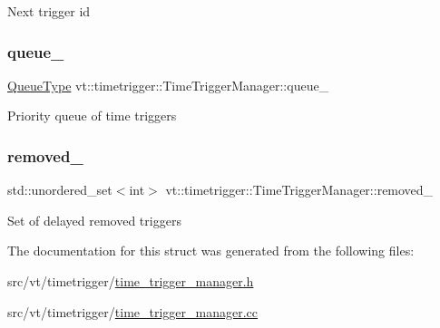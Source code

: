 Next trigger id \mbox{\label{structvt_1_1timetrigger_1_1_time_trigger_manager_aa7a4a5f115644540035596b1057e2ac2}} 
\subsubsection{\texorpdfstring{queue\+\_\+}{queue\_}}
{\footnotesize\ttfamily \hyperlink{structvt_1_1timetrigger_1_1_time_trigger_manager_ad5dc7eeeb4b0d12a5582544d8f0a08c8}{Queue\+Type} vt\+::timetrigger\+::\+Time\+Trigger\+Manager\+::queue\+\_\+\hspace{0.3cm}{\ttfamily [private]}}

Priority queue of time triggers \mbox{\label{structvt_1_1timetrigger_1_1_time_trigger_manager_aac6dda4fd78e5338f6bec56b75e038cd}} 
\subsubsection{\texorpdfstring{removed\+\_\+}{removed\_}}
{\footnotesize\ttfamily std\+::unordered\+\_\+set$<$int$>$ vt\+::timetrigger\+::\+Time\+Trigger\+Manager\+::removed\+\_\+\hspace{0.3cm}{\ttfamily [private]}}

Set of delayed removed triggers 

The documentation for this struct was generated from the following files\+:\begin{DoxyCompactItemize}
\item 
src/vt/timetrigger/\hyperlink{time__trigger__manager_8h}{time\+\_\+trigger\+\_\+manager.\+h}\item 
src/vt/timetrigger/\hyperlink{time__trigger__manager_8cc}{time\+\_\+trigger\+\_\+manager.\+cc}\end{DoxyCompactItemize}
